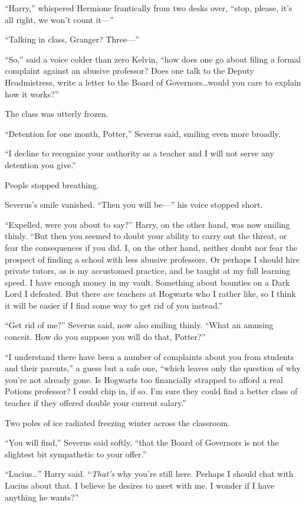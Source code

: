“Harry,” whispered Hermione frantically from two desks over, “stop, please, it’s all right, we won’t count it—”

“Talking in class, Granger? Three—”

“So,” said a voice colder than zero Kelvin, “how does one go about filing a formal complaint against an abusive professor? Does one talk to the Deputy Headmistress, write a letter to the Board of Governors…would you care to explain how it works?”

The class was utterly frozen.

“Detention for one month, Potter,” Severus said, smiling even more broadly.

“I decline to recognize your authority as a teacher and I will not serve any detention you give.”

People stopped breathing.

Severus’s smile vanished. “Then you will be—” his voice stopped short.

“Expelled, were you about to say?” Harry, on the other hand, was now smiling thinly. “But then you seemed to doubt your ability to carry out the threat, or fear the consequences if you did. I, on the other hand, neither doubt nor fear the prospect of finding a school with less abusive professors. Or perhaps I should hire private tutors, as is my accustomed practice, and be taught at my full learning speed. I have enough money in my vault. Something about bounties on a Dark Lord I defeated. But there \emph{are} teachers at Hogwarts who I rather like, so I think it will be easier if I find some way to get rid of you instead.”

“Get rid of me?” Severus said, now also smiling thinly. “What an amusing conceit. How do you suppose you will do that, Potter?”

“I understand there have been a number of complaints about you from students and their parents,” a guess but a safe one, “which leaves only the question of why you’re not already gone. Is Hogwarts too financially strapped to afford a real Potions professor? I could chip in, if so. I’m sure they could find a better class of teacher if they offered double your current salary.”

Two poles of ice radiated freezing winter across the classroom.

“You will find,” Severus said softly, “that the Board of Governors is not the slightest bit sympathetic to your offer.”

“Lucius…” Harry said. “\emph{That’s} why you’re still here. Perhaps I should chat with Lucius about that. I believe he desires to meet with me. I wonder if I have anything he wants?”

